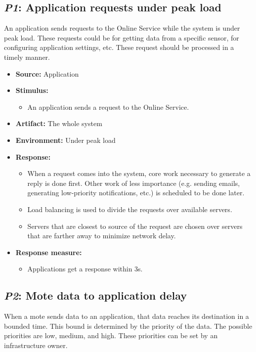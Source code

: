 \subsection{\emph{P1}: Application requests under peak load}
An application sends requests to the Online Service while the system is under
peak load. These requests could be for getting data from a specific
sensor, for configuring application settings, etc.
These request should be processed in a timely manner.

\begin{itemize}
    \item \textbf{Source:} Application
    \item \textbf{Stimulus:}
        \begin{itemize}
            \item An application sends a request to the Online Service.
        \end{itemize}

    \item \textbf{Artifact:} The whole system
    \item \textbf{Environment:} Under peak load
    \item \textbf{Response:}
        \begin{itemize}
            \item When a request comes into the system, core work necessary
                  to generate a reply is done first. Other work of less importance
                  (e.g. sending emails, generating low-priority notifications, etc.)
                  is scheduled to be done later.
            \item Load balancing is used to divide the requests over
                  available servers.
            \item Servers that are closest to source of the request are chosen
                  over servers that are farther away to minimize network delay.
        \end{itemize}

    \item \textbf{Response measure:}
        \begin{itemize}
            \item Applications get a response within 3s.
        \end{itemize}
\end{itemize}

\subsection{\emph{P2}: Mote data to application delay}
When a mote sends data to an application, that data reaches its
destination in a bounded time. This bound is determined by the priority
of the data. The possible priorities are low, medium, and high.
These priorities can be set by an infrastructure owner.

